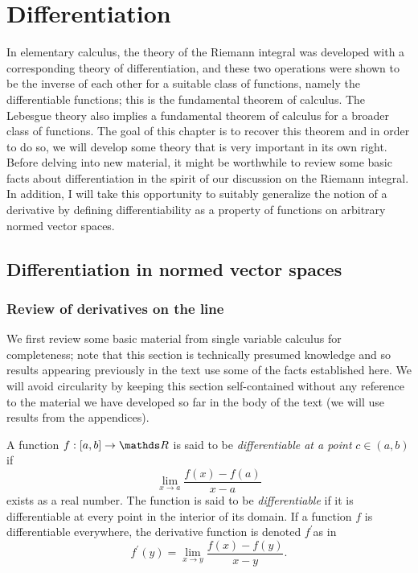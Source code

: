 
\chapter{\label{chap:Differentiation}Differentiation}

In elementary calculus, the theory of the Riemann integral was developed
with a corresponding theory of differentiation, and these two operations
were shown to be the inverse of each other for a suitable class of
functions, namely the differentiable functions; this is the fundamental
theorem of calculus. The Lebesgue theory also implies a fundamental
theorem of calculus for a broader class of functions. The goal of
this chapter is to recover this theorem and in order to do so, we
will develop some theory that is very important in its own right.
Before delving into new material, it might be worthwhile to review
some basic facts about differentiation in the spirit of our discussion
on the Riemann integral. In addition, I will take this opportunity
to suitably generalize the notion of a derivative by defining differentiability
as a property of functions on arbitrary normed vector spaces.

\section{Differentiation in normed vector spaces}

\subsection{Review of derivatives on the line}

We first review some basic material from single variable calculus
for completeness; note that this section is technically presumed knowledge
and so results appearing previously in the text use some of the facts
established here. We will avoid circularity by keeping this section
self-contained without any reference to the material we have developed
so far in the body of the text (we will use results from the appendices).
\begin{defn}
\label{def:differentiable}A function $f:\left[a,b\right]\to\R$ is
said to be \emph{differentiable at a point }$c\in\left(a,b\right)$
if 
\[
\lim_{x\to a}\frac{f\left(x\right)-f\left(a\right)}{x-a}
\]
exists as a real number. The function is said to be \emph{differentiable
}if it is differentiable at every point in the interior of its domain.
If a function $f$ is differentiable everywhere, the derivative function
is denoted $f^{\prime}$as in 
\[
f^{\prime}\left(y\right)=\lim_{x\to y}\frac{f\left(x\right)-f\left(y\right)}{x-y}.
\]
\end{defn}

